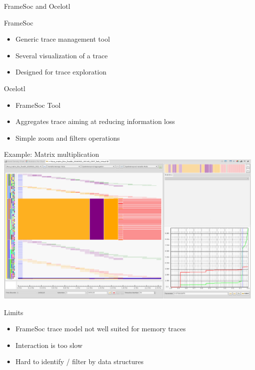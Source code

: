 \documentclass[xcolor={usenames,dvipsnames},hyperref={pdfusetitle}]{beamer}
\begin{document}
\begin{frame}{FrameSoc and Ocelotl}
    \begin{block}{FrameSoc~\cite{Pagano14frameSoC}}
        \begin{itemize}
            \item Generic trace management tool
            \item Several visualization of a trace
            \item Designed for trace exploration
        \end{itemize}
    \end{block}
    \pause
    \begin{alertblock}{Ocelotl~\cite{Dosimont14Ocelotl}}
        \begin{itemize}
            \item FrameSoc Tool
            \item Aggregates trace aiming at reducing information loss
            \item Simple zoom and filters operations
        \end{itemize}
    \end{alertblock}
\end{frame}

\begin{frame}{Example: Matrix multiplication}
    \centering
    \includegraphics[width=\linewidth]{ocelotl/overview.png}
\end{frame}

\begin{frame}{Limits}
    \begin{itemize}
        \item FrameSoc trace model not well suited for memory traces
        \item Interaction is too slow
        \item Hard to identify / filter by data structures
    \end{itemize}
\end{frame}
\end{document}
